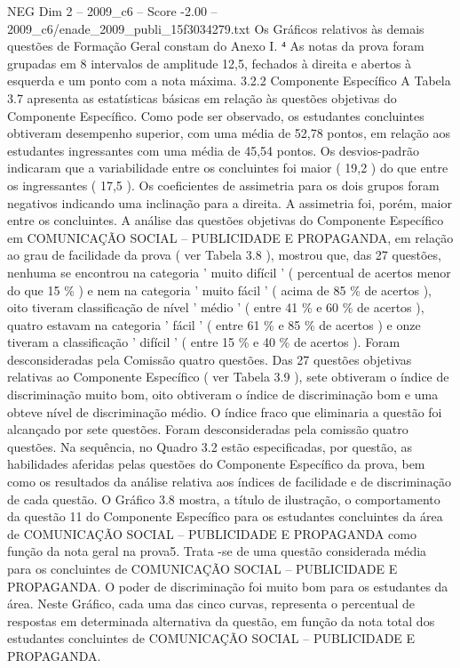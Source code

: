 \begin{textsample}{NEG Dim 2 – 2009\_c6 – Score -2.00 – 2009\_c6/enade\_2009\_publi\_15f3034279.txt}
Os Gráficos relativos às demais questões de Formação Geral constam do Anexo I. ⁴ As notas da prova foram grupadas em 8 intervalos de amplitude 12,5, fechados à direita e abertos à esquerda e um ponto com a nota máxima. 3.2.2 Componente Específico A Tabela 3.7 apresenta as estatísticas básicas em relação às questões objetivas do Componente Específico.
Como pode ser observado, os estudantes concluintes obtiveram desempenho superior, com uma média de 52,78 pontos, em relação aos estudantes ingressantes com uma média de 45,54 pontos.
Os desvios-padrão indicaram que a variabilidade entre os concluintes foi maior ( 19,2 ) do que entre os ingressantes ( 17,5 ).
Os coeficientes de assimetria para os dois grupos foram negativos indicando uma inclinação para a direita.
A assimetria foi, porém, maior entre os concluintes.
A análise das questões objetivas do Componente Específico em COMUNICAÇÃO SOCIAL – PUBLICIDADE E PROPAGANDA, em relação ao grau de facilidade da prova ( ver Tabela 3.8 ), mostrou que, das 27 questões, nenhuma se encontrou na categoria ' muito difícil ' ( percentual de acertos menor do que 15 \% ) e nem na categoria ' muito fácil ' ( acima de 85 \% de acertos ), oito tiveram classificação de nível ' médio ' ( entre 41 \% e 60 \% de acertos ), quatro estavam na categoria ' fácil ' ( entre 61 \% e 85 \% de acertos ) e onze tiveram a classificação ' difícil ' ( entre 15 \% e 40 \% de acertos ).
Foram desconsideradas pela Comissão quatro questões.
Das 27 questões objetivas relativas ao Componente Específico ( ver Tabela 3.9 ), sete obtiveram o índice de discriminação muito bom, oito obtiveram o índice de discriminação bom e uma obteve nível de discriminação médio.
O índice fraco que eliminaria a questão foi alcançado por sete questões.
Foram desconsideradas pela comissão quatro questões.
Na sequência, no Quadro 3.2 estão especificadas, por questão, as habilidades aferidas pelas questões do Componente Específico da prova, bem como os resultados da análise relativa aos índices de facilidade e de discriminação de cada questão.
O Gráfico 3.8 mostra, a título de ilustração, o comportamento da questão 11 do Componente Específico para os estudantes concluintes da área de COMUNICAÇÃO SOCIAL – PUBLICIDADE E PROPAGANDA como função da nota geral na prova5.
Trata -se de uma questão considerada média para os concluintes de COMUNICAÇÃO SOCIAL – PUBLICIDADE E PROPAGANDA.
O poder de discriminação foi muito bom para os estudantes da área.
Neste Gráfico, cada uma das cinco curvas, representa o percentual de respostas em determinada alternativa da questão, em função da nota total dos estudantes concluintes de COMUNICAÇÃO SOCIAL – PUBLICIDADE E PROPAGANDA.

\end{textsample}
